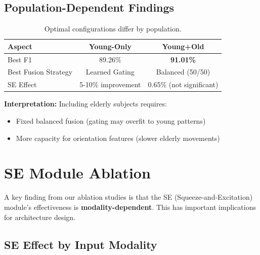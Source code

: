 \documentclass{article}
\begin{document}
\subsection{Population-Dependent Findings}

\begin{table}[htbp]
    \centering
    \caption{Optimal configurations differ by population.}
    \label{tab:population_diff}
    \begin{tabular}{lcc}
        \toprule
        \textbf{Aspect} & \textbf{Young-Only} & \textbf{Young+Old} \\
        \midrule
        Best F1 & 89.26\% & \textbf{91.01\%} \\
        Best Fusion Strategy & Learned Gating & Balanced (50/50) \\
        SE Effect & 5-10\% improvement & 0.65\% (not significant) \\
        \bottomrule
    \end{tabular}
\end{table}

\textbf{Interpretation:} Including elderly subjects requires:
\begin{itemize}
    \item Fixed balanced fusion (gating may overfit to young patterns)
    \item More capacity for orientation features (slower elderly movements)
\end{itemize}

\section{SE Module Ablation}

A key finding from our ablation studies is that the SE (Squeeze-and-Excitation) module's effectiveness is \textbf{modality-dependent}. This has important implications for architecture design.

\subsection{SE Effect by Input Modality}
\end{document}
